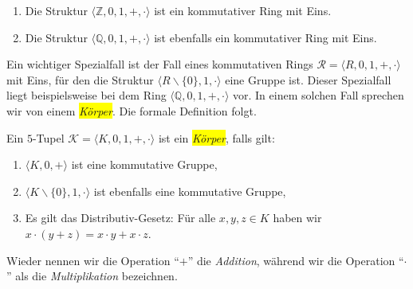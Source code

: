 \examples
\begin{enumerate}
\item Die Struktur $\langle \mathbb{Z}, 0, 1, +, \cdot \rangle$ ist ein kommutativer
      Ring mit  Eins.  
\item Die Struktur $\langle \mathbb{Q}, 0, 1, +, \cdot \rangle$ ist ebenfalls ein kommutativer Ring mit
      Eins.   \eoxs
\end{enumerate}

\begin{center}
\colorbox{red}{}
\end{center}

Ein wichtiger Spezialfall ist der Fall eines kommutativen Rings 
$\mathcal{R} = \langle R, 0, 1, +, \cdot \rangle$ mit Eins, 
f\"{u}r den die Struktur $\langle R \backslash \{0\}, 1, \cdot \rangle$
eine Gruppe ist.  Dieser Spezialfall liegt beispielsweise bei dem Ring  
$\langle \mathbb{Q}, 0, 1, +, \cdot \rangle$ vor.  In einem solchen Fall sprechen wir von einem \colorbox{yellow}{\emph{K\"{o}rper}}.  Die formale
Definition folgt.
\pagebreak


\begin{Definition}[K\"{o}rper]
Ein $5$-Tupel $\mathcal{K} = \langle K, 0, 1, +, \cdot \rangle$ ist ein \colorbox{yellow}{\emph{K\"{o}rper}}, falls gilt:
\begin{enumerate}
\item $\langle K, 0, + \rangle$ ist eine kommutative Gruppe,
\item $\langle K \backslash \{ 0 \}, 1, \cdot \rangle$ ist ebenfalls eine kommutative Gruppe,
\item Es gilt das Distributiv-Gesetz: F\"{u}r alle $x, y,z \in K$ haben wir
      \\[0.2cm]
      \hspace*{1.3cm} 
      $x \cdot (y + z) = x \cdot y + x \cdot z$.
\end{enumerate}
Wieder nennen wir die  Operation ``$+$'' die \emph{Addition}, w\"{a}hrend wir die Operation ``$\cdot$'' 
als die \emph{Multiplikation} bezeichnen. \eox
\end{Definition}

